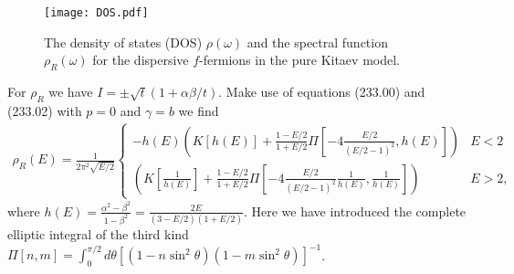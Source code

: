 \documentclass[aps,pra,preprint,groupedaddress]{revtex4-1}
\newcommand{\1}{\mathds{1}}
\begin{document}
\begin{figure}
	\centering
	\texttt{[image: DOS.pdf]}
	\caption{The density of states (DOS) $\rho(\omega)$ and the spectral function $\rho_R(\omega)$ for the dispersive $f$-fermions in the pure Kitaev model.}
	\label{fig:DOS}
\end{figure}


For $\rho_R$ we have $I=\pm\sqrt{t}(1+\alpha \beta /t)$. Make use of equations (233.00) and (233.02) with $p=0$ and $\gamma=b$ we find
\begin{align}
\rho_R(E) = \frac{1}{2 \pi^2 \sqrt{E/2}} \left\{ \begin{array}{cc}
-h(E) \left(K[h(E)]  + \frac{1-E/2}{1+E/2} \Pi\left[-4\frac{E/2}{(E/2-1)^2},h(E)\right]\right) & E<2\\
\left(K[\frac{1}{h(E)}] + \frac{1-E/2}{1+E/2} \Pi\left[-4\frac{E/2}{(E/2-1)^2} \frac{1}{h(E)} ,\frac{1}{h(E)}\right]\right) & E>2,
\end{array} \right.
\end{align}
where $h(E) = \frac{\alpha^2 - \beta^2}{1-\beta^2} = \frac{2 E}{(3-E/2)(1+E/2)}$. Here we have introduced the complete elliptic integral of the third kind $\Pi[n,m] = \int_0^{\pi/2} d\theta \left[(1-n \sin^2\theta)(1-m \sin^2\theta)\right]^{-1}$.
\end{document}

